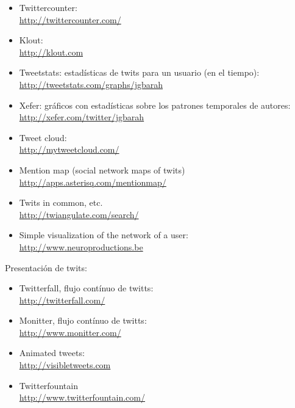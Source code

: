 \documentclass[a4paper,12pt]{article}
\begin{document}
\begin{itemize}
\item Twittercounter: \\
   \url{http://twittercounter.com/}

\item Klout: \\
   \url{http://klout.com}

\item Tweetstats: estadísticas de twits para un usuario (en el tiempo): \\
  \url{http://tweetstats.com/graphs/jgbarah}

\item Xefer: gráficos con estadísticas sobre los patrones temporales de autores: \\
  \url{http://xefer.com/twitter/jgbarah}

\item Tweet cloud: \\
  \url{http://mytweetcloud.com/}

\item Mention map (social network maps of twits) \\
  \url{http://apps.asterisq.com/mentionmap/}

\item Twits in common, etc. \\
  \url{http://twiangulate.com/search/}

\item Simple visualization of the network of a user: \\
  \url{http://www.neuroproductions.be}
\end{itemize}

Presentación de twits:

\begin{itemize}
\item Twitterfall, flujo contínuo de twitts: \\
  \url{http://twitterfall.com/}

\item Monitter, flujo contínuo de twitts: \\
  \url{http://www.monitter.com/}

\item Animated tweets: \\
  \url{http://visibletweets.com}

\item Twitterfountain \\
  \url{http://www.twitterfountain.com/}
\end{itemize}
\end{document}
